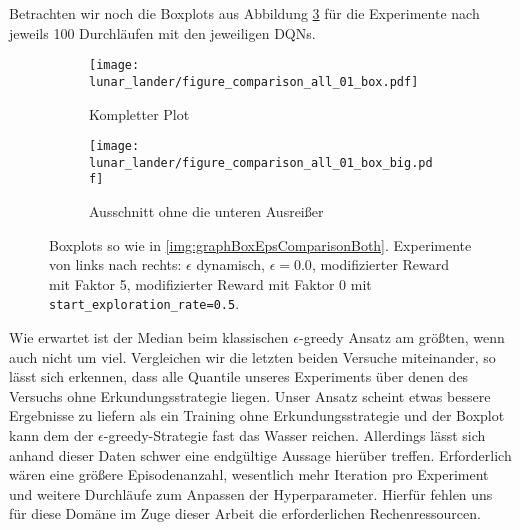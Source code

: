 Betrachten wir noch die Boxplots aus Abbildung \ref{img:lunarComparisonAllBox01Both} für die Experimente nach jeweils 100 Durchläufen mit den jeweiligen DQNs.
\begin{figure}[h!]
    \centering
    \begin{subfigure}[b]{0.7\textwidth}
        \texttt{[image: lunar\_lander/figure\_comparison\_all\_01\_box.pdf]}
        \caption{Kompletter Plot}
        \label{img:lunarComparisonAllBox01}
    \end{subfigure}
    \begin{subfigure}[b]{0.7\textwidth}
        \texttt{[image: lunar\_lander/figure\_comparison\_all\_01\_box\_big.pdf]}
        \caption{Ausschnitt ohne die unteren Ausreißer}
        \label{img:lunarComparisonAllBox01Big}
    \end{subfigure}
    \caption{Boxplots so wie in \ref{img:graphBoxEpsComparisonBoth}. Experimente von links nach rechts: $ \epsilon $ dynamisch, $ \epsilon = 0.0 $, modifizierter Reward mit Faktor 5, modifizierter Reward mit Faktor 0 mit \texttt{start_exploration_rate=0.5}.}
    \label{img:lunarComparisonAllBox01Both}
\end{figure}
Wie erwartet ist der Median beim klassischen $ \epsilon $-greedy Ansatz am größten, wenn auch nicht um viel. Vergleichen wir die letzten beiden Versuche miteinander, so lässt sich erkennen, dass alle Quantile unseres Experiments über denen des Versuchs ohne Erkundungsstrategie liegen. Unser Ansatz scheint etwas bessere Ergebnisse zu liefern als ein Training ohne Erkundungsstrategie und der Boxplot kann dem der $ \epsilon $-greedy-Strategie fast das Wasser reichen. Allerdings lässt sich anhand dieser Daten schwer eine endgültige Aussage hierüber treffen. Erforderlich wären eine größere Episodenanzahl, wesentlich mehr Iteration pro Experiment und weitere Durchläufe zum Anpassen der Hyperparameter. Hierfür fehlen uns für diese Domäne im Zuge dieser Arbeit die erforderlichen Rechenressourcen.


